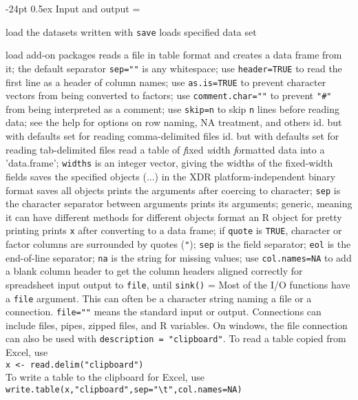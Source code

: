 \documentclass[10pt,landscape]{article}
\makeatletter
\renewcommand\section{\@startsection{section}{1}{0mm}%
                                     {-24pt}%
                                     {0.5ex}%
                                {\color{blue}\normalfont\large\bfseries}}
\newcommand{\code}{\texttt}
\makeatother
\begin{document}
\begin{multicols*}{3}
\section{Input and output}
\everypar={\hangindent=9mm}

	{load the datasets written with \code{save}}
	{loads specified data set}

	{load add-on packages}
 reads a file in table format and creates a data frame from it; the default separator \code{sep=""} is any whitespace; use \code{header=TRUE} to read the first line as a header of column names; use \code{as.is=TRUE} to prevent character vectors from being converted to factors; use \code{comment.char=""} to prevent \code{"\#"} from being interpreted as a comment; use \code{skip=n} to skip \code{n}	{lines before reading data; see the help for options on row naming, NA treatment, and others}
	{id. but with defaults set for reading comma-delimited files}
	{id. but with defaults set for reading tab-delimited files}
 read a table of \emph{f}ixed \emph{w}idth \emph{f}ormatted data into a 'data.frame'; \code{widths}	{is an integer vector, giving the widths of the fixed-width fields}
	{saves the specified objects (...) in the XDR platform-independent binary format}
	{saves all objects}
 prints the arguments after coercing to character; \code{sep}	{is the character separator between arguments}
	{prints its arguments; generic, meaning it can have different methods for different objects}
	{format an R object for pretty printing}
 prints \code{x} after converting to a data frame; if \code{quote} is \code{TRUE}, character or factor columns are surrounded by quotes (\code{"}); \code{sep} is the field separator; \code{eol} is the end-of-line separator; \code{na} is the string for missing values; use \code{col.names=NA}	{to add a blank column header to get the column headers aligned correctly for spreadsheet input}
 output to \code{file}, until \code{sink()} \everypar={\hangindent=0mm} Most of the I/O functions have a \code{file} argument. This can often be a character string naming a file or a connection.  \code{file=""}	{means the standard input or output. Connections can include files, pipes, zipped files, and R variables.}
On windows, the file connection can also be used with \code{description =
"clipboard"}. To read a table copied from Excel, use \\
\code{x <- read.delim("clipboard")}\\
To write a table to the clipboard for Excel, use \\
\code{write.table(x,"clipboard",sep="\textbackslash t",col.names=NA)}


\end{multicols*}
\end{document}
